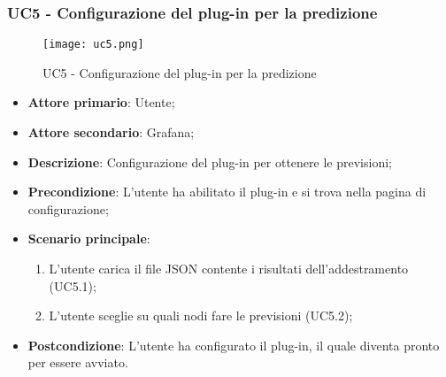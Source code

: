 \newpage
\subsubsection{UC5 - Configurazione del plug-in per la predizione}
\label{sssec:uc5}

\begin{figure}[h!]
  \begin{center}
    \texttt{[image: uc5.png]}\\
    \caption{UC5 - Configurazione del plug-in per la predizione}%
    \label{fig:uc3}
  \end{center}
  \end{figure}

  \begin{itemize}
    \item \textbf{Attore primario}: Utente;
    \item \textbf{Attore secondario}: Grafana;
    \item \textbf{Descrizione}: Configurazione del plug-in per ottenere le previsioni;
    \item \textbf{Precondizione}: L'utente ha abilitato il plug-in e si trova nella pagina di configurazione;
    \item \textbf{Scenario principale}:
    \begin{enumerate}
      \item L'utente carica il file JSON contente i risultati dell'addestramento (UC5.1);
      \item L'utente sceglie su quali nodi fare le previsioni (UC5.2);
    \end{enumerate}
    \item \textbf{Postcondizione}: L'utente ha configurato il plug-in, il quale diventa pronto per essere avviato.
  \end{itemize}

